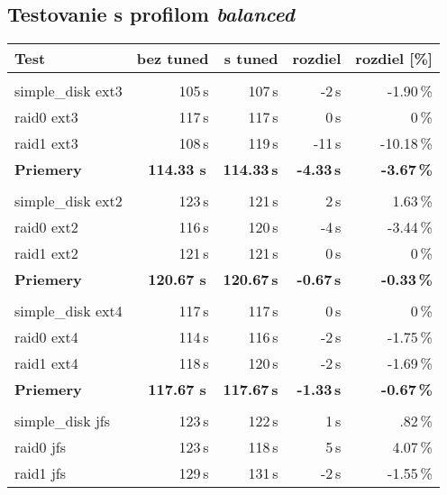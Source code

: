 %
%
\subsection{Testovanie s profilom \emph{balanced}}

\begin{table}[H]
\begin{center}
\begin{tabular}{|l|r r r r|}
    \hline
    \textbf{Test} & \textbf{bez tuned} & \textbf{s tuned} & \textbf{rozdiel} & \textbf{rozdiel [\%]} \\
    \hline & \\[-1em]\hline
    simple\_disk ext3 & 105\,s & 107\,s & -2\,s & -1.90\,\% \\
    raid0 ext3 & 117\,s & 117\,s & 0\,s & 0\,\% \\
    raid1 ext3 & 108\,s & 119\,s & -11\,s & -10.18\,\% \\
    \hline
    \textbf{Priemery} & \textbf{114.33 s}\,& \textbf{114.33\,s} & \textbf{-4.33\,s} & \textbf{-3.67\,\%} \\
    \hline & \\[-1em]\hline
    simple\_disk ext2 & 123\,s & 121\,s & 2\,s & 1.63\,\% \\
    raid0 ext2 & 116\,s & 120\,s & -4\,s & -3.44\,\% \\
    raid1 ext2 & 121\,s & 121\,s & 0\,s & 0\,\% \\
    \hline
    \textbf{Priemery} & \textbf{120.67 s}\,& \textbf{120.67\,s} & \textbf{-0.67\,s} & \textbf{-0.33\,\%} \\
    \hline & \\[-1em]\hline
    simple\_disk ext4 & 117\,s & 117\,s & 0\,s & 0\,\% \\
    raid0 ext4 & 114\,s & 116\,s & -2\,s & -1.75\,\% \\
    raid1 ext4 & 118\,s & 120\,s & -2\,s & -1.69\,\% \\
    \hline
    \textbf{Priemery} & \textbf{117.67 s}\,& \textbf{117.67\,s} & \textbf{-1.33\,s} & \textbf{-0.67\,\%} \\
    \hline & \\[-1em]\hline
    simple\_disk jfs & 123\,s & 122\,s & 1\,s & .82\,\% \\
    raid0 jfs & 123\,s & 118\,s & 5\,s & 4.07\,\% \\
    raid1 jfs & 129\,s & 131\,s & -2\,s & -1.55\,\% \\
    \hline

\end{tabular}
\end{center}
\end{table}
